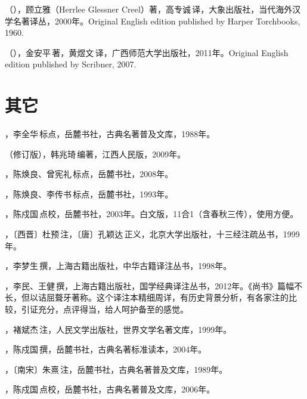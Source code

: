 （），顾立雅（Herrlee Glessner Creel）著，高专诚\,译，大象出版社，当代海外汉学名著译丛，2000年。Original English edition published by Harper Torchbooks, 1960.

（），金安平\,著，黄煜文\,译，广西师范大学出版社，2011年。Original English edition published by Scribner, 2007.



\lypdfbookmark\section*{其它}

，李全华\,标点，岳麓书社，古典名著普及文库，1988年。

（修订版），韩兆琦\,编著，江西人民版，2009年。

，陈焕良、曾宪礼\,标点，岳麓书社，2008年。

，陈焕良、李传书\,标点，岳麓书社，1993年。

，陈戍国\,点校，岳麓书社，2003年。白文版，11合1（含春秋三传），使用方便。

，〔西晋〕杜预\,注，〔唐〕孔颖达\,正义，北京大学出版社，十三经注疏丛书，1999年。

，李梦生\,撰，上海古籍出版社，中华古籍译注丛书，1998年。

，李民、王健\,撰，上海古籍出版社，国学经典译注丛书，2012年。《尚书》篇幅不长，但以诘屈聱牙著称。这个译注本精细周详，有历史背景分析，有各家注的比较，引证充分，点评得当，给人呵护备至的感觉。

，褚斌杰\,注，人民文学出版社，世界文学名著文库，1999年。

，陈戍国\,撰，岳麓书社，古典名著标准读本，2004年。

，〔南宋〕朱熹\,注，岳麓书社，古典名著普及文库，1989年。

，陈戍国\,点校，岳麓书社，古典名著普及文库，2006年。

